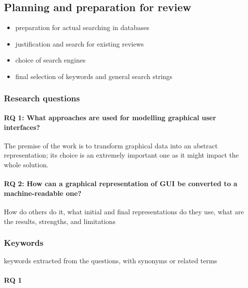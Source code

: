 \subsection[Planning and preparation]{Planning and preparation for review}\label{subsec:planning-and-preparation-for-review}

\begin{itemize}
    \item preparation for actual searching in databases
    \item justification and search for existing reviews
    \item choice of search engines
    \item final selection of keywords and general search strings
\end{itemize}

\subsubsection{Research questions}


\paragraph{RQ 1: What approaches are used for modelling graphical user interfaces?}
The premise of the work is to transform graphical data into an abstract representation;
its choice is an extremely important one as it might impact the whole solution.

\paragraph{RQ 2: How can a graphical representation of GUI be converted to a machine-readable one?}
How do others do it, what initial and final representations do they use, what are the results, strengths, and limitations

\subsubsection{Keywords}
keywords extracted from the questions, with synonyms or related terms

\paragraph{RQ 1}

